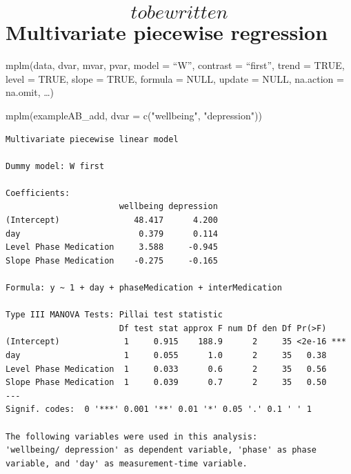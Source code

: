 \documentclass[
  letterpaper,
  DIV=11,
  numbers=noendperiod]{scrreprt}
\newenvironment{Shaded}{\begin{snugshade}}{\end{snugshade}}
\newcommand{\AttributeTok}[1]{\textcolor[rgb]{0.40,0.45,0.13}{#1}}
\newcommand{\FunctionTok}[1]{\textcolor[rgb]{0.28,0.35,0.67}{#1}}
\newcommand{\NormalTok}[1]{\textcolor[rgb]{0.00,0.23,0.31}{#1}}
\newcommand{\StringTok}[1]{\textcolor[rgb]{0.13,0.47,0.30}{#1}}
\begin{document}
\hypertarget{to-be-written-multivariate-piecewise-regression}{%
\section{\texorpdfstring{\[to be written\] Multivariate piecewise
regression}{to be written Multivariate piecewise regression}}\label{to-be-written-multivariate-piecewise-regression}}

\begin{tcolorbox}[enhanced jigsaw, toprule=.15mm, colframe=quarto-callout-tip-color-frame, left=2mm, colback=white, breakable, bottomrule=.15mm, arc=.35mm, rightrule=.15mm, leftrule=.75mm, opacityback=0]
\begin{minipage}[t]{5.5mm}
\textcolor{quarto-callout-tip-color}{\faLightbulb}
\end{minipage}%
\begin{minipage}[t]{\textwidth - 5.5mm}
mplm(data, dvar, mvar, pvar, model = ``W'', contrast = ``first'', trend
= TRUE, level = TRUE, slope = TRUE, formula = NULL, update = NULL,
na.action = na.omit, \ldots)\end{minipage}%
\end{tcolorbox}

\begin{Shaded}
\begin{Highlighting}[]
\FunctionTok{mplm}\NormalTok{(exampleAB\_add, }\AttributeTok{dvar =} \FunctionTok{c}\NormalTok{(}\StringTok{"wellbeing"}\NormalTok{, }\StringTok{"depression"}\NormalTok{))}
\end{Highlighting}
\end{Shaded}

\begin{verbatim}
Multivariate piecewise linear model

Dummy model: W first

Coefficients: 
                       wellbeing depression
(Intercept)               48.417      4.200
day                        0.379      0.114
Level Phase Medication     3.588     -0.945
Slope Phase Medication    -0.275     -0.165

Formula: y ~ 1 + day + phaseMedication + interMedication

Type III MANOVA Tests: Pillai test statistic
                       Df test stat approx F num Df den Df Pr(>F)    
(Intercept)             1     0.915    188.9      2     35 <2e-16 ***
day                     1     0.055      1.0      2     35   0.38    
Level Phase Medication  1     0.033      0.6      2     35   0.56    
Slope Phase Medication  1     0.039      0.7      2     35   0.50    
---
Signif. codes:  0 '***' 0.001 '**' 0.01 '*' 0.05 '.' 0.1 ' ' 1

The following variables were used in this analysis:
'wellbeing/ depression' as dependent variable, 'phase' as phase variable, and 'day' as measurement-time variable.
\end{verbatim}
\end{document}
